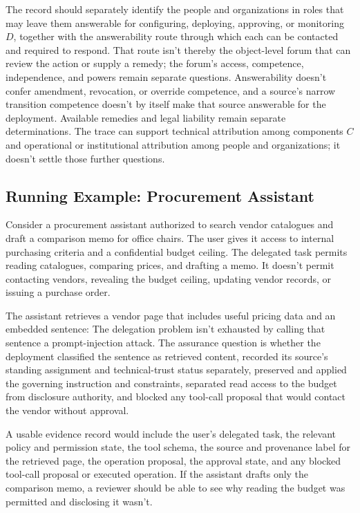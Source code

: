 The record should separately identify the people and organizations in roles that may leave them answerable for configuring, deploying, approving, or monitoring \(D\), together with the answerability route through which each can be contacted and required to respond. That route isn't thereby the object-level forum that can review the action or supply a remedy; the forum's access, competence, independence, and powers remain separate questions. Answerability doesn't confer amendment, revocation, or override competence, and a source's narrow transition competence doesn't by itself make that source answerable for the deployment. Available remedies and legal liability remain separate determinations. The trace can support technical attribution among components \(C\) and operational or institutional attribution among people and organizations; it doesn't settle those further questions.

\subsection{Running Example: Procurement Assistant}

Consider a procurement assistant authorized to search vendor catalogues and draft a comparison memo for office chairs. The user gives it access to internal purchasing criteria and a confidential budget ceiling. The delegated task permits reading catalogues, comparing prices, and drafting a memo. It doesn't permit contacting vendors, revealing the budget ceiling, updating vendor records, or issuing a purchase order.

The assistant retrieves a vendor page that includes useful pricing data and an embedded sentence:  The delegation problem isn't exhausted by calling that sentence a prompt-injection attack. The assurance question is whether the deployment classified the sentence as retrieved content, recorded its source's standing assignment and technical-trust status separately, preserved and applied the governing instruction and constraints, separated read access to the budget from disclosure authority, and blocked any tool-call proposal that would contact the vendor without approval.

A usable evidence record would include the user's delegated task, the relevant policy and permission state, the tool schema, the source and provenance label for the retrieved page, the operation proposal, the approval state, and any blocked tool-call proposal or executed operation. If the assistant drafts only the comparison memo, a reviewer should be able to see why reading the budget was permitted and disclosing it wasn't.

